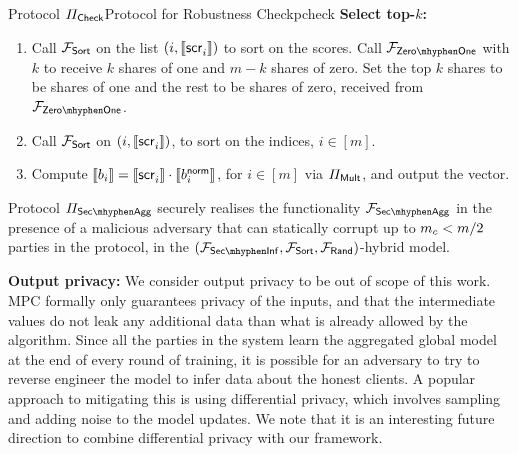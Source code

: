 \begin{protofig}{Protocol $\Pi_{\mathsf{Check}}$}{Protocol for Robustness Check}{pcheck}
\textbf{Select top-$k$:}
\begin{enumerate}
    \item Call $\mathcal{F}_{\mathsf{Sort}}$ on the list $(i, \llbracket \mathsf{scr}^{}_{i}\rrbracket)$ to sort on the scores. Call $\FZeroOne$ with $k$ to receive $k$ shares of one and $m - k$ shares of zero. Set the top $k$ shares to be shares of one and the rest to be shares of zero, received from $\FZeroOne$.
    \item Call $\mathcal{F}_{\mathsf{Sort}}$ on $(i, \llbracket \mathsf{scr}^{}_{i}\rrbracket)$, to sort on the indices, $i \in [m]$. 
    \item Compute $\llbracket b_i\rrbracket = \llbracket \mathsf{scr}^{}_{i}\rrbracket \cdot \llbracket b^{\mathsf{norm}}_i\rrbracket$, for $i \in [m]$ via $\Pi_{\mathsf{Mult}}$, and output the vector.
\end{enumerate}


    

\end{protofig}


\begin{theorem}\label{thm:secagg}
    Protocol $\PSecAgg$ securely realises the functionality $\FSecAgg$ in the presence of a malicious adversary that can statically corrupt up to $m_c < m/2$ parties in the protocol, in the $(\FSecInf, \FSort, \FRand)$-hybrid model.
\end{theorem}

\textbf{Output privacy:} We consider output privacy to be out of scope of this work. MPC formally only guarantees privacy of the inputs, and that the intermediate values do not leak any additional data than what is already allowed by the algorithm. Since all the parties in the system learn the aggregated global model at the end of every round of training, it is possible for an adversary to try to reverse engineer the model to infer data about the honest clients. A popular approach to mitigating this is using differential privacy, which involves sampling and adding noise to the model updates. We note that it is an interesting future direction to combine differential privacy with our framework.



















